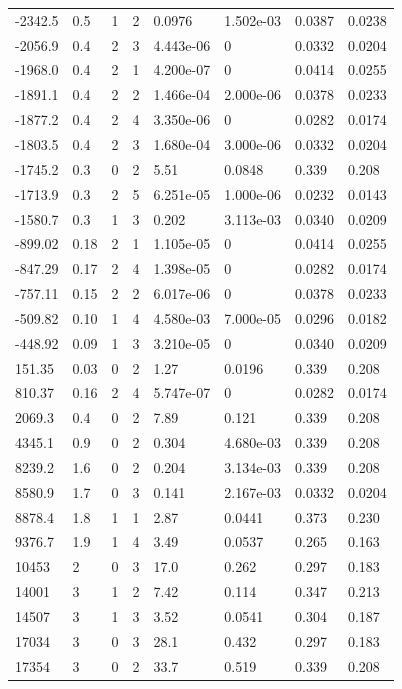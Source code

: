 \documentclass[preview]{standalone}
\begin{document}
{{\begin{tabular}{L{1.2cm}C{1.2cm} C{0.3cm}C{0.5cm} C{1.4cm}C{1.4cm} C{1.4cm}C{1.4cm}}
  -2342.5  &   0.5  & 1     &  2 &  0.0976  & 1.502e-03  & 0.0387 &  0.0238   \\ 
  -2056.9  &   0.4  & 2     &  3 &  4.443e-06  & 0  & 0.0332 &  0.0204   \\ 
  -1968.0  &   0.4  & 2     &  1 &  4.200e-07  & 0  & 0.0414 &  0.0255   \\ 
  -1891.1  &   0.4  & 2     &  2 &  1.466e-04  & 2.000e-06  & 0.0378 &  0.0233   \\ 
  -1877.2  &   0.4  & 2     &  4 &  3.350e-06  & 0  & 0.0282 &  0.0174   \\ 
  -1803.5  &   0.4  & 2     &  3 &  1.680e-04  & 3.000e-06  & 0.0332 &  0.0204   \\ 
  -1745.2  &   0.3  & 0     &  2 &  5.51  & 0.0848  & 0.339 &  0.208   \\ 
  -1713.9  &   0.3  & 2     &  5 &  6.251e-05  & 1.000e-06  & 0.0232 &  0.0143   \\ 
  -1580.7  &   0.3  & 1     &  3 &  0.202  & 3.113e-03  & 0.0340 &  0.0209   \\ 
  -899.02  &  0.18  & 2     &  1 &  1.105e-05  & 0  & 0.0414 &  0.0255   \\ 
  -847.29  &  0.17  & 2     &  4 &  1.398e-05  & 0  & 0.0282 &  0.0174   \\ 
  -757.11  &  0.15  & 2     &  2 &  6.017e-06  & 0  & 0.0378 &  0.0233   \\ 
  -509.82  &  0.10  & 1     &  4 &  4.580e-03  & 7.000e-05  & 0.0296 &  0.0182   \\ 
  -448.92  &  0.09  & 1     &  3 &  3.210e-05  & 0  & 0.0340 &  0.0209   \\ 
  151.35  &  0.03  & 0     &  2 &  1.27  & 0.0196  & 0.339 &  0.208   \\ 
  810.37  &  0.16  & 2     &  4 &  5.747e-07  & 0  & 0.0282 &  0.0174   \\ 
  2069.3  &   0.4  & 0     &  2 &  7.89  & 0.121  & 0.339 &  0.208   \\ 
  4345.1  &   0.9  & 0     &  2 &  0.304  & 4.680e-03  & 0.339 &  0.208   \\ 
  8239.2  &   1.6  & 0     &  2 &  0.204  & 3.134e-03  & 0.339 &  0.208   \\ 
  8580.9  &   1.7  & 0     &  3 &  0.141  & 2.167e-03  & 0.0332 &  0.0204   \\ 
  8878.4  &   1.8  & 1     &  1 &  2.87  & 0.0441  & 0.373 &  0.230   \\ 
  9376.7  &   1.9  & 1     &  4 &  3.49  & 0.0537  & 0.265 &  0.163   \\ 
  10453  &     2  & 0     &  3 &  17.0  & 0.262  & 0.297 &  0.183   \\ 
  14001  &     3  & 1     &  2 &  7.42  & 0.114  & 0.347 &  0.213   \\ 
  14507  &     3  & 1     &  3 &  3.52  & 0.0541  & 0.304 &  0.187   \\ 
  17034  &     3  & 0     &  3 &  28.1  & 0.432  & 0.297 &  0.183   \\ 
  17354  &     3  & 0     &  2 &  33.7  & 0.519  & 0.339 &  0.208   \\ 
\hline 
\end{tabular} 

}}
\end{document}
